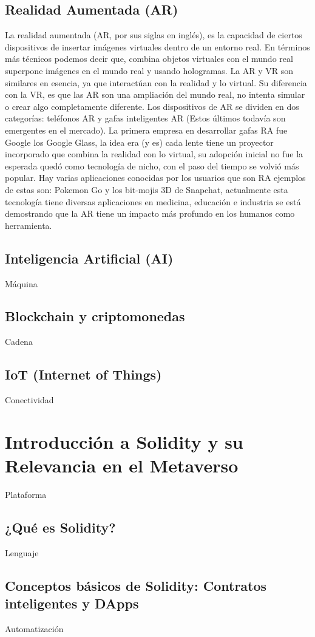 \documentclass[a4paper,10pt]{article}
\begin{document}
	\subsection{Realidad Aumentada (AR)}
	La realidad aumentada (AR, por sus siglas en inglés), es la capacidad de ciertos dispositivos de insertar imágenes virtuales dentro de un entorno real. En términos más técnicos podemos decir que, combina objetos virtuales con el mundo real superpone imágenes en el mundo real y usando hologramas. La AR y VR son similares en esencia, ya que interactúan con la realidad y lo virtual. Su diferencia con la VR, es que las AR son una ampliación del mundo real, no intenta simular o crear algo completamente diferente. Los dispositivos de AR se dividen en dos categorías: teléfonos AR y gafas inteligentes AR (Estos últimos todavía son emergentes en el mercado). La primera empresa en desarrollar gafas RA fue Google los Google Glass, la idea era (y es) cada lente tiene un proyector incorporado que combina la realidad con lo virtual, su adopción inicial no fue la esperada quedó como tecnología de nicho, con el paso del tiempo se volvió más popular. Hay varias aplicaciones conocidas por los usuarios que son RA ejemplos de estas son: Pokemon Go y los bit-mojis 3D de Snapchat, actualmente esta tecnología tiene diversas aplicaciones en medicina, educación e industria se está demostrando que la AR tiene un impacto más profundo en los humanos como herramienta.
	\subsection{Inteligencia Artificial (AI)}
	Máquina
	\subsection{Blockchain y criptomonedas}
	Cadena
	\subsection{IoT (Internet of Things)}
	Conectividad
	
	\section{Introducción a Solidity y su Relevancia en el Metaverso}
	Plataforma
	\subsection{¿Qué es Solidity?}
	Lenguaje
	\subsection{Conceptos básicos de Solidity: Contratos inteligentes y DApps}
	Automatización
\end{document}
